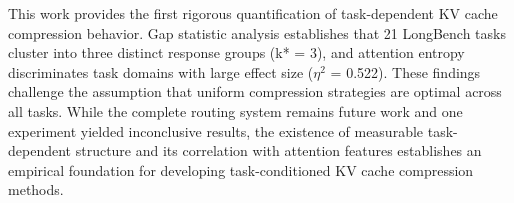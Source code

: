 
This work provides the first rigorous quantification of task-dependent KV cache compression behavior. Gap statistic analysis establishes that 21 LongBench tasks cluster into three distinct response groups (k* = 3), and attention entropy discriminates task domains with large effect size ($\eta^2$ = 0.522). These findings challenge the assumption that uniform compression strategies are optimal across all tasks. While the complete routing system remains future work and one experiment yielded inconclusive results, the existence of measurable task-dependent structure and its correlation with attention features establishes an empirical foundation for developing task-conditioned KV cache compression methods.
